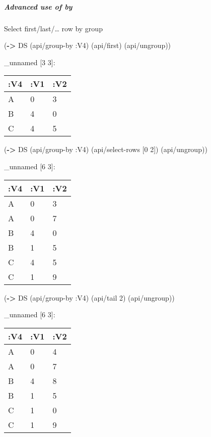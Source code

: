 \documentclass[]{article}
\newenvironment{Shaded}{\begin{snugshade}}{\end{snugshade}}
\newcommand{\AttributeTok}[1]{\textcolor[rgb]{0.77,0.63,0.00}{#1}}
\newcommand{\DecValTok}[1]{\textcolor[rgb]{0.00,0.00,0.81}{#1}}
\newcommand{\KeywordTok}[1]{\textcolor[rgb]{0.13,0.29,0.53}{\textbf{#1}}}
\newcommand{\NormalTok}[1]{#1}
\let\oldsubparagraph\subparagraph
\renewcommand{\subparagraph}[1]{\oldsubparagraph{#1}\mbox{}}
\begin{document}
\hypertarget{advanced-use-of-by}{%
\subparagraph{Advanced use of by}\label{advanced-use-of-by}}

Select first/last/\ldots{} row by group

\begin{Shaded}
\begin{Highlighting}[]
\NormalTok{(}\KeywordTok{->}\NormalTok{ DS}
\NormalTok{    (api/group-by }\AttributeTok{:V4}\NormalTok{)}
\NormalTok{    (api/first)}
\NormalTok{    (api/ungroup))}
\end{Highlighting}
\end{Shaded}

\_unnamed {[}3 3{]}:

\begin{longtable}[]{@{}lll@{}}
\toprule
:V4 & :V1 & :V2\tabularnewline
\midrule
\endhead
A & 0 & 3\tabularnewline
B & 4 & 0\tabularnewline
C & 4 & 5\tabularnewline
\bottomrule
\end{longtable}

\begin{Shaded}
\begin{Highlighting}[]
\NormalTok{(}\KeywordTok{->}\NormalTok{ DS}
\NormalTok{    (api/group-by }\AttributeTok{:V4}\NormalTok{)}
\NormalTok{    (api/select-rows [}\DecValTok{0} \DecValTok{2}\NormalTok{])}
\NormalTok{    (api/ungroup))}
\end{Highlighting}
\end{Shaded}

\_unnamed {[}6 3{]}:

\begin{longtable}[]{@{}lll@{}}
\toprule
:V4 & :V1 & :V2\tabularnewline
\midrule
\endhead
A & 0 & 3\tabularnewline
A & 0 & 7\tabularnewline
B & 4 & 0\tabularnewline
B & 1 & 5\tabularnewline
C & 4 & 5\tabularnewline
C & 1 & 9\tabularnewline
\bottomrule
\end{longtable}

\begin{Shaded}
\begin{Highlighting}[]
\NormalTok{(}\KeywordTok{->}\NormalTok{ DS}
\NormalTok{    (api/group-by }\AttributeTok{:V4}\NormalTok{)}
\NormalTok{    (api/tail }\DecValTok{2}\NormalTok{)}
\NormalTok{    (api/ungroup))}
\end{Highlighting}
\end{Shaded}

\_unnamed {[}6 3{]}:

\begin{longtable}[]{@{}lll@{}}
\toprule
:V4 & :V1 & :V2\tabularnewline
\midrule
\endhead
A & 0 & 4\tabularnewline
A & 0 & 7\tabularnewline
B & 4 & 8\tabularnewline
B & 1 & 5\tabularnewline
C & 1 & 0\tabularnewline
C & 1 & 9\tabularnewline
\bottomrule
\end{longtable}
\end{document}

